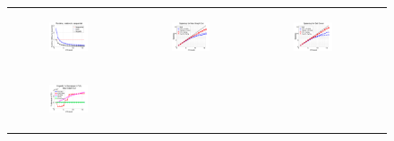 \documentclass{article} %
\begin{document}
\begin{figure}[ht]
  \centering
  \begin{tabular}{cccc}
	  \begin{subfigure}[h]{0.32\textwidth}
	  	\includegraphics[width=125pt]{images/summary_relruntime.png}
			\caption{}
			\label{fig:relruntime}
	  \end{subfigure} &
	  \begin{subfigure}[h]{0.32\textwidth}
	  	\includegraphics[width=125pt]{images/summary_speedup_maxgraphcut.png}
			\caption{}
			\label{fig:speedup_maxgraphcut}
	  \end{subfigure} &
	  \begin{subfigure}[h]{0.32\textwidth}
	  	\includegraphics[width=125pt]{images/summary_speedup_setcover.png}
			\caption{}
			\label{fig:speedup_setcover}
	  \end{subfigure} \\
	  \begin{subfigure}[h]{0.32\textwidth}
	  	\includegraphics[width=125pt]{images/summary_diffFA_maxgraphcut.png}
			\caption{}
			\label{fig:difffa_maxgraphcut}
	  \end{subfigure} &

\end{tabular}
\end{figure}
\end{document}
